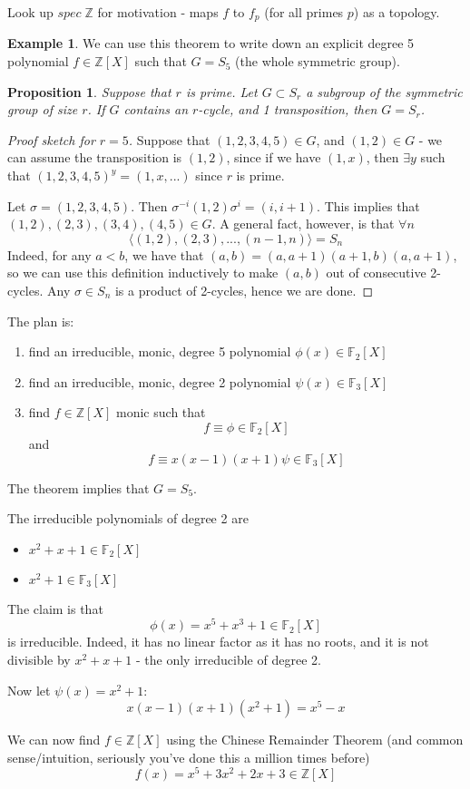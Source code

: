 \documentclass{article}
\theoremstyle{definition}
\newtheorem{exmp}{Example}[section]
\theoremstyle{plain}%
\newtheorem{prop}[thm]{Proposition}
\theoremstyle{remark}
\newcommand{\Z}{\mathbb{Z}}
\begin{document}
Look up $spec \;\Z$ for motivation - maps $f$ to $f_p$ (for all primes $p$) as a topology.


\begin{exmp}
    We can use this theorem to write down an explicit degree 5 polynomial $f \in \Z[X]$ such that $G = S_5$ (the whole symmetric group).
    
    \begin{prop}
        Suppose that $r$ is prime. Let $G \subset S_r$ a subgroup of the symmetric group of size $r$. If $G$ contains an $r$-cycle, and 1 transposition, then $G = S_r$.
    \end{prop}
    
    \begin{proof}[Proof sketch for $r = 5$]
        Suppose that $(1,2,3,4,5) \in G$, and $(1,2) \in G$ - we can assume the transposition is $(1,2)$, since if we have $(1, x)$, then $\exists y$ such that $(1,2,3,4,5)^y = (1,x, ...)$ since $r$ is prime.
        
        Let $\sigma = (1,2,3,4,5)$. Then $\sigma^{-i}(1,2)\sigma^i = (i, i+1)$. This implies that $(1,2), (2,3), (3,4), (4,5) \in G$. A general fact, however, is that $\forall n$
        \[\langle (1,2), (2,3), ..., (n-1, n) \rangle = S_n\]
        Indeed, for any $a < b$, we have that $(a,b) = (a, a+1)(a+1,b)(a, a+1)$, so we can use this definition inductively to make $(a,b)$ out of consecutive 2-cycles. Any $\sigma \in S_n$ is a product of 2-cycles, hence we are done.
    \end{proof}
    
    The plan is:
    \begin{enumerate}
        \item find an irreducible, monic, degree 5 polynomial $\phi(x) \in \mathbb{F}_2[X]$
        \item find an irreducible, monic, degree 2 polynomial $\psi(x) \in \mathbb{F}_3[X]$
        \item find $f \in \Z[X]$ monic such that \[f \equiv \phi \in \mathbb{F}_2[X]\] and \[f \equiv x(x-1)(x+1)\psi \in \mathbb{F}_3[X]\] 
    \end{enumerate}
    The theorem implies that $G = S_5$.
    
    The irreducible polynomials of degree 2 are
    \begin{itemize}
        \item $x^2 + x + 1 \in \mathbb{F}_2[X]$
        \item $x^2 + 1 \in \mathbb{F}_3[X]$
    \end{itemize}
    The claim is that
    \[\phi(x) = x^5 + x^3 + 1 \in \mathbb{F}_2[X]\]
    is irreducible. Indeed, it has no linear factor as it has no roots, and it is not divisible by $x^2 + x + 1$ - the only irreducible of degree 2.
    
    Now let $\psi(x) = x^2 + 1$:
    \[x(x-1)(x+1)(x^2 + 1) = x^5 - x\]
    
    We can now find $f \in \Z[X]$ using the Chinese Remainder Theorem (and common sense/intuition, seriously you've done this a million times before)
    \[f(x) = x^5 +3x^2 +2x + 3 \in \Z[X]\]
\end{exmp}
\end{document}
